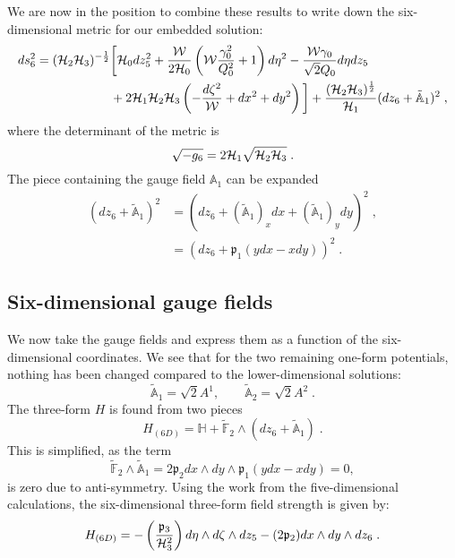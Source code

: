 We are now in the position to combine these results to write down the six-dimensional metric for our embedded solution:
\begin{equation*}
\begin{aligned}
        ds^2_6 = ({\cal H}_2 {\cal H}_3)^{-\frac{1}{2}} &\bigg[{\cal H}_0 dz_5^2 + \frac{{\cal W}}{2{\cal H}_0}\left({\cal W} \frac{\gamma_0^2}{Q_0^2} + 1 \right) d\eta^2 - \frac{{\cal W} \gamma_0}{\sqrt{2} Q_0} d\eta dz_5 \\ &+ 2{\cal H}_1 {\cal H}_2 {\cal H}_3 \left(- \frac{ d\zeta^2}{{\cal W}} + dx^2 + dy^2 \right) \bigg] + \frac{({\cal H}_2 {\cal H}_3)^{\frac{1}{2}}}{{\cal H}_1} (dz_6 + \tilde{\mathbb{A}}_1)^2 \;,
\end{aligned}
\end{equation*}
where the determinant of the metric is
\begin{equation*}
    \sqrt{-g_6} = 2 {\cal H}_1 \sqrt{{\cal H}_2 {\cal H}_3} \;.
\end{equation*}
The piece containing the gauge field $\mathbb{A}_1$ can be expanded
\begin{equation*}
\begin{aligned}
        (dz_6 + \tilde{\mathbb{A}}_1)^2 &= (dz_6 + (\tilde{\mathbb{A}}_1)_x dx + (\tilde{\mathbb{A}}_1)_y dy)^2 \;,\\
        &= (dz_6 + \mathfrak{p}_1(ydx - xdy))^2 \;.
\end{aligned}
\end{equation*}


\subsection*{Six-dimensional gauge fields}
We now take the gauge fields and express them as a function of the six-dimensional coordinates. We see that for the two remaining one-form potentials, nothing has been changed compared to the lower-dimensional solutions:
\begin{equation*}
    \tilde{\mathbb{A}}_1 = \sqrt{2} A^1, \qquad \tilde{\mathbb{A}}_2 = \sqrt{2} A^2 \;.
\end{equation*}
The three-form $H$ is found from two pieces
\begin{equation*}
    H_{(6D)} = \mathbb{H} + \tilde{\mathbb{F}}_2 \wedge ( dz_6 + \tilde{\mathbb{A}}_1) \;.
\end{equation*}
This is simplified, as the term
\begin{equation*}
    \tilde{\mathbb{F}}_2 \wedge \tilde{\mathbb{A}}_1 = 2 \mathfrak{p}_2 dx \wedge dy \wedge \mathfrak{p}_1 \left(y dx - xdy \right) = 0,
\end{equation*}
is zero due to anti-symmetry. Using the work from the five-dimensional calculations, the six-dimensional three-form field strength is given by:
\begin{equation*}
\begin{aligned}
        H_{(6D)} = -\left( \frac{ \mathfrak{p}_3}{{\cal H}_3^2} \right) d\eta \wedge d\zeta \wedge dz_5
 -( 2\mathfrak{p}_2) dx \wedge dy \wedge dz_6 \;.
\end{aligned}
\end{equation*}


